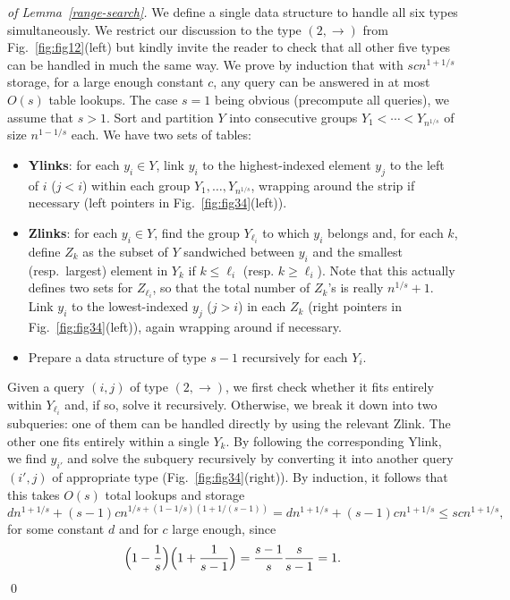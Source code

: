 \documentclass[oribibl,envcountsect,envcountsame]{llncs}
\begin{document}
\begin{proof}[of Lemma~\ref{range-search}]
We define a single data structure to handle all six types
simultaneously. We restrict our discussion to the type $(2, \rightarrow)$ from
Fig.~\ref{fig:fig12}(left) but kindly invite the reader to 
check that all other five types can be handled in much the same way.
We prove by induction that with $s c n^{1+1/s}$ storage, for a
large enough constant $c$, any query can be answered in at most $O(s)$ 
table lookups.
The case $s=1$ being obvious (precompute all queries),
we assume that $s>1$.
Sort and partition $Y$ into consecutive groups $Y_1<\cdots < Y_{n^{1/s}}$
of size $n^{1-1/s}$ each. We have two sets of tables:


\begin{itemize}
\item
\textbf{Ylinks}: for each $y_i\in Y$, 
link $y_i$ to the highest-indexed element $y_j$ to the left of $i$ ($j<i$) 
within each group $Y_{1},\ldots, Y_{n^{1/s}}$, wrapping around the
strip if necessary
(left pointers in Fig.~\ref{fig:fig34}(left)).
\item
\textbf{Zlinks}: for each $y_i\in Y$, 
find the group $Y_{\ell_i}$ to which $y_i$ belongs and,
for each $k$, define $Z_k$ as the subset of $Y$
sandwiched  between $y_i$ and the smallest (resp.~largest) 
element in $Y_k$ if $k\leq \ell_i$ (resp.  $k\geq \ell_i$).
Note that this actually defines two sets for $Z_{\ell_i}$, so that
the total number of $Z_k$'s is really $n^{1/s}+1$.
Link $y_i$ to the lowest-indexed $y_j$ ($j>i$) in each $Z_k$
(right pointers in Fig.~\ref{fig:fig34}(left)), again
wrapping around if necessary.

\item
Prepare a data structure of type $s-1$ recursively for each $Y_i$.
\end{itemize}

Given a query $(i,j)$ of type $(2, \rightarrow)$, we first 
check whether it
fits entirely within $Y_{\ell_i}$ and, if so, solve it recursively.
Otherwise, we break it down into two subqueries: 
one of them can be handled directly by using the relevant Zlink.
The other one fits entirely within a single $Y_k$.
By following the corresponding Ylink, we find $y_{i'}$
and solve the subquery recursively by converting it
into another query $(i',j)$ of appropriate type
(Fig.~\ref{fig:fig34}(right)).
By induction, it follows that this takes $O(s)$ total lookups and storage 
\[
dn^{1+1/s} + (s-1) c n^{1/s + (1-1/s)(1+1/(s-1))} =
dn^{1+1/s} + (s-1) c n^{1 + 1/s} \leq 
s c n^{1+1/s}, 
\]
for some constant $d$ and for $c$ large enough, since
\[
\Bigl(1-\frac{1}{s}\Bigr)\Bigl(1+\frac{1}{s-1}\Bigr) = 
\frac{s-1}{s} \frac{s}{s-1} = 1.
\]
\qed\end{proof}
\end{document}
